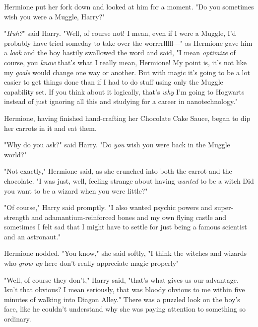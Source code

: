 Hermione put her fork down and looked at him for a moment. "Do you sometimes
wish you were a Muggle, Harry?"

"\emph{Huh?}" said Harry. "Well, of course not! I mean, even if I were a Muggle,
I'd probably have tried someday to take over the worrrrlllll—" as Hermione gave
him a \emph{look} and the boy hastily swallowed the word and said, "I mean
\emph{optimize} of course, you \emph{know} that's what I really mean, Hermione!
My point is, it's not like my \emph{goals} would change one way or another. But
with magic it's going to be a lot easier to get things done than if I had to do
stuff using only the Muggle capability set. If you think about it logically,
that's \emph{why} I'm going to Hogwarts instead of just ignoring all this and
studying for a career in nanotechnology."

Hermione, having finished hand-crafting her Chocolate Cake Sauce, began to dip
her carrots in it and eat them.

"Why do you ask?" said Harry. "Do \emph{you} wish you were back in the Muggle
world?"

"Not exactly," Hermione said, as she crunched into both the carrot and the
chocolate. "I was just, well, feeling strange about having \emph{wanted} to be
a witch{\el} Did you want to be a wizard when you were little?"

"Of course," Harry said promptly. "I also wanted psychic powers and
super-strength and adamantium-reinforced bones and my own flying castle and
sometimes I felt sad that I might have to settle for just being a famous
scientist and an astronaut."

Hermione nodded. "You know," she said softly, "I think the witches and wizards
who \emph{grow up} here don't really appreciate magic properly{\el}"

"Well, of course they don't," Harry said, "that's what gives us our advantage.
Isn't that obvious? I mean seriously, that was bloody obvious to me within five
minutes of walking into Diagon Alley." There was a puzzled look on the boy's
face, like he couldn't understand why she was paying attention to something so
ordinary.

